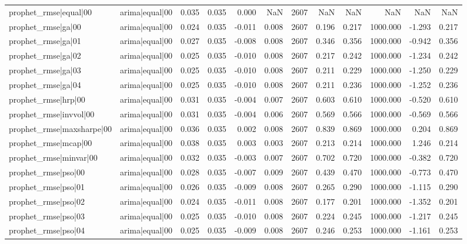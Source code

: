 \begin{table}
\begin{tabular}{llrrrrrrrrrr}
prophet\_rmse|equal|00 & arima|equal|00 & 0.035 & 0.035 & 0.000 & NaN & 2607 & NaN & NaN & NaN & NaN & NaN \\
prophet\_rmse|ga|00 & arima|equal|00 & 0.024 & 0.035 & -0.011 & 0.008 & 2607 & 0.196 & 0.217 & 1000.000 & -1.293 & 0.217 \\
prophet\_rmse|ga|01 & arima|equal|00 & 0.027 & 0.035 & -0.008 & 0.008 & 2607 & 0.346 & 0.356 & 1000.000 & -0.942 & 0.356 \\
prophet\_rmse|ga|02 & arima|equal|00 & 0.025 & 0.035 & -0.010 & 0.008 & 2607 & 0.217 & 0.242 & 1000.000 & -1.234 & 0.242 \\
prophet\_rmse|ga|03 & arima|equal|00 & 0.025 & 0.035 & -0.010 & 0.008 & 2607 & 0.211 & 0.229 & 1000.000 & -1.250 & 0.229 \\
prophet\_rmse|ga|04 & arima|equal|00 & 0.025 & 0.035 & -0.010 & 0.008 & 2607 & 0.211 & 0.236 & 1000.000 & -1.252 & 0.236 \\
prophet\_rmse|hrp|00 & arima|equal|00 & 0.031 & 0.035 & -0.004 & 0.007 & 2607 & 0.603 & 0.610 & 1000.000 & -0.520 & 0.610 \\
prophet\_rmse|invvol|00 & arima|equal|00 & 0.031 & 0.035 & -0.004 & 0.006 & 2607 & 0.569 & 0.566 & 1000.000 & -0.569 & 0.566 \\
prophet\_rmse|maxsharpe|00 & arima|equal|00 & 0.036 & 0.035 & 0.002 & 0.008 & 2607 & 0.839 & 0.869 & 1000.000 & 0.204 & 0.869 \\
prophet\_rmse|mcap|00 & arima|equal|00 & 0.038 & 0.035 & 0.003 & 0.003 & 2607 & 0.213 & 0.214 & 1000.000 & 1.246 & 0.214 \\
prophet\_rmse|minvar|00 & arima|equal|00 & 0.032 & 0.035 & -0.003 & 0.007 & 2607 & 0.702 & 0.720 & 1000.000 & -0.382 & 0.720 \\
prophet\_rmse|pso|00 & arima|equal|00 & 0.028 & 0.035 & -0.007 & 0.009 & 2607 & 0.439 & 0.470 & 1000.000 & -0.773 & 0.470 \\
prophet\_rmse|pso|01 & arima|equal|00 & 0.026 & 0.035 & -0.009 & 0.008 & 2607 & 0.265 & 0.290 & 1000.000 & -1.115 & 0.290 \\
prophet\_rmse|pso|02 & arima|equal|00 & 0.024 & 0.035 & -0.011 & 0.008 & 2607 & 0.177 & 0.201 & 1000.000 & -1.352 & 0.201 \\
prophet\_rmse|pso|03 & arima|equal|00 & 0.025 & 0.035 & -0.010 & 0.008 & 2607 & 0.224 & 0.245 & 1000.000 & -1.217 & 0.245 \\
prophet\_rmse|pso|04 & arima|equal|00 & 0.025 & 0.035 & -0.009 & 0.008 & 2607 & 0.246 & 0.253 & 1000.000 & -1.161 & 0.253 \\

\end{tabular}
\end{table}
